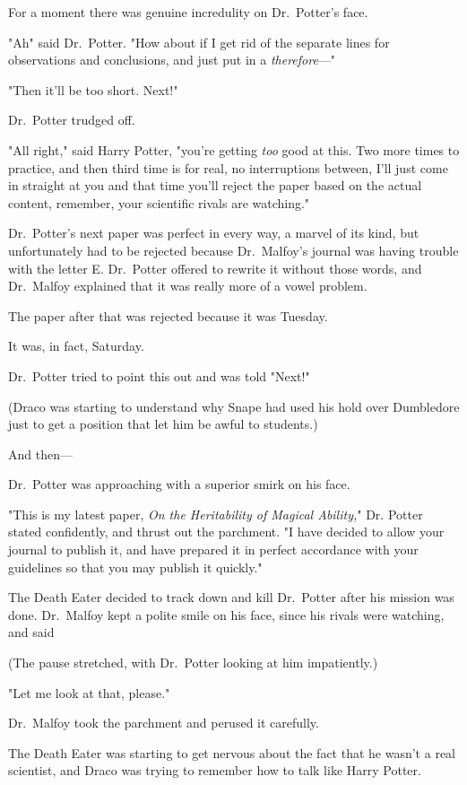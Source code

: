 For a moment there was genuine incredulity on Dr.~Potter's face.

"Ah{\el}" said Dr.~Potter. "How about if I get rid of the separate lines for
observations and conclusions, and just put in a \emph{therefore}\mbox{---}"

"Then it'll be too short. Next!"

Dr.~Potter trudged off.

"All right," said Harry Potter, "you're getting \emph{too} good at this. Two
more times to practice, and then third time is for real, no interruptions
between, I'll just come in straight at you and that time you'll reject the
paper based on the actual content, remember, your scientific rivals are
watching."

Dr.~Potter's next paper was perfect in every way, a marvel of its kind, but
unfortunately had to be rejected because Dr.~Malfoy's journal was having
trouble with the letter E. Dr.~Potter offered to rewrite it without those
words, and Dr.~Malfoy explained that it was really more of a vowel problem.

The paper after that was rejected because it was Tuesday.

It was, in fact, Saturday.

Dr.~Potter tried to point this out and was told "Next!"

(Draco was starting to understand why Snape had used his hold over Dumbledore
just to get a position that let him be awful to students.)

And then---

Dr.~Potter was approaching with a superior smirk on his face.

"This is my latest paper, \emph{On the Heritability of Magical Ability,}" Dr.
Potter stated confidently, and thrust out the parchment. "I have decided to
allow your journal to publish it, and have prepared it in perfect accordance
with your guidelines so that you may publish it quickly."

The Death Eater decided to track down and kill Dr.~Potter after his mission was
done. Dr.~Malfoy kept a polite smile on his face, since his rivals were
watching, and said{\el}

(The pause stretched, with Dr.~Potter looking at him impatiently.)

{\el} "Let me look at that, please."

Dr.~Malfoy took the parchment and perused it carefully.

The Death Eater was starting to get nervous about the fact that he wasn't a
real scientist, and Draco was trying to remember how to talk like Harry Potter.


